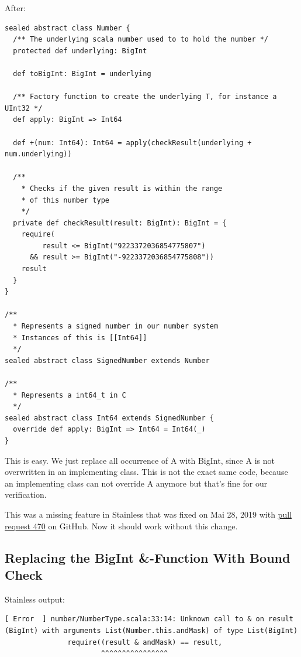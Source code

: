 \documentclass[runningheads]{llncs}
\begin{document}
After:
\begin{lstlisting}[style=scala]
sealed abstract class Number {
  /** The underlying scala number used to to hold the number */
  protected def underlying: BigInt

  def toBigInt: BigInt = underlying

  /** Factory function to create the underlying T, for instance a UInt32 */
  def apply: BigInt => Int64

  def +(num: Int64): Int64 = apply(checkResult(underlying + num.underlying))

  /**
    * Checks if the given result is within the range
    * of this number type
    */
  private def checkResult(result: BigInt): BigInt = {
    require(
         result <= BigInt("9223372036854775807")
      && result >= BigInt("-9223372036854775808"))
    result
  }
}

/**
  * Represents a signed number in our number system
  * Instances of this is [[Int64]]
  */
sealed abstract class SignedNumber extends Number

/**
  * Represents a int64_t in C
  */
sealed abstract class Int64 extends SignedNumber {
  override def apply: BigInt => Int64 = Int64(_)
}
\end{lstlisting}

This is easy.
We just replace all occurrence of A with BigInt, since A is not overwritten in an implementing class.
This is not the exact same code, because an implementing class can not override A anymore but that's fine for our verification.

This was a missing feature in Stainless that was fixed on Mai 28, 2019 with \href{https://github.com/epfl-lara/stainless/pull/470}{pull request 470} on GitHub.
Now it should work without this change.


\subsection{Replacing the BigInt \&-Function With Bound Check}
\label{sec:bound_check}

Stainless output:
\begin{lstlisting}[style=stainless]
  [ Error  ] number/NumberType.scala:33:14: Unknown call to & on result (BigInt) with arguments List(Number.this.andMask) of type List(BigInt)
               require((result & andMask) == result,
                       ^^^^^^^^^^^^^^^^

\end{lstlisting}
\end{document}
